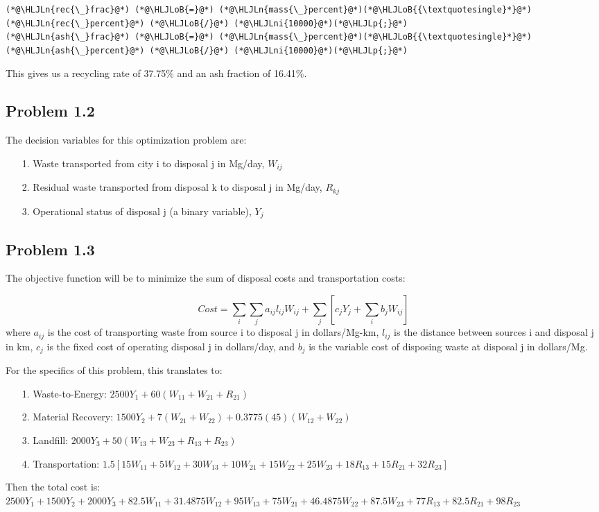 \documentclass[12pt,a4paper]{article}
\newcommand{\HLJLn}[1]{#1}
\newcommand{\HLJLni}[1]{\textcolor[RGB]{59,151,46}{#1}}
\newcommand{\HLJLoB}[1]{\textcolor[RGB]{102,102,102}{\textbf{#1}}}
\newcommand{\HLJLp}[1]{#1}
\begin{document}
\begin{lstlisting}
(*@\HLJLn{rec{\_}frac}@*) (*@\HLJLoB{=}@*) (*@\HLJLn{mass{\_}percent}@*)(*@\HLJLoB{{\textquotesingle}*}@*)(*@\HLJLn{rec{\_}percent}@*) (*@\HLJLoB{/}@*) (*@\HLJLni{10000}@*)(*@\HLJLp{;}@*)
(*@\HLJLn{ash{\_}frac}@*) (*@\HLJLoB{=}@*) (*@\HLJLn{mass{\_}percent}@*)(*@\HLJLoB{{\textquotesingle}*}@*)(*@\HLJLn{ash{\_}percent}@*) (*@\HLJLoB{/}@*) (*@\HLJLni{10000}@*)(*@\HLJLp{;}@*)
\end{lstlisting}


This gives us a recycling rate of 37.75\% and an ash fraction of 16.41\%.

\subsection{Problem 1.2}
The decision variables for this optimization problem are:

\begin{itemize}
\item[1. ] Waste transported from city i to disposal j in Mg/day, $W_{ij}$


\item[2. ] Residual waste transported from disposal k to disposal j in Mg/day, $R_{kj}$


\item[3. ] Operational status of disposal j (a binary variable), $Y_j$

\end{itemize}
\subsection{Problem 1.3}
The objective function will be to minimize the sum of disposal costs and transportation costs:

\[
Cost = \sum_i\sum_j a_{ij}l_{ij}W_{ij} + \sum_j[c_jY_j+\sum_ib_jW_{ij}]
\]
where $a_{ij}$ is the cost of transporting waste from source i to disposal j in dollars/Mg-km,  $l_{ij}$ is the distance between sources i and disposal j in km,  $c_j$ is the fixed cost of operating disposal j in dollars/day, and  $b_j$ is the variable cost of disposing waste at disposal j in dollars/Mg.

For the specifics of this problem, this translates to:

\begin{itemize}
\item[1. ] Waste-to-Energy: $2500Y_1 + 60(W_{11}+W_{21}+R_{21})$


\item[2. ] Material Recovery: $1500Y_2 + 7(W_{21}+W_{22})+0.3775(45)(W_{12}+W_{22})$


\item[3. ] Landfill: $2000Y_3 + 50(W_{13}+W_{23}+R_{13}+R_{23})$


\item[4. ] Transportation: $1.5[15W_{11}+5W_{12}+30W_{13}+10W_{21}+15W_{22}+25W_{23}+18R_{13}+15R_{21}+32R_{23}]$

\end{itemize}
Then the total cost is: $2500Y_1 + 1500Y_2 + 2000Y_3 + 82.5W_{11} + 31.4875W_{12} + 95W_{13} + 75W_{21} + 46.4875W_{22} + 87.5W_{23} + 77R_{13} + 82.5R_{21} + 98R_{23}$
\end{document}
